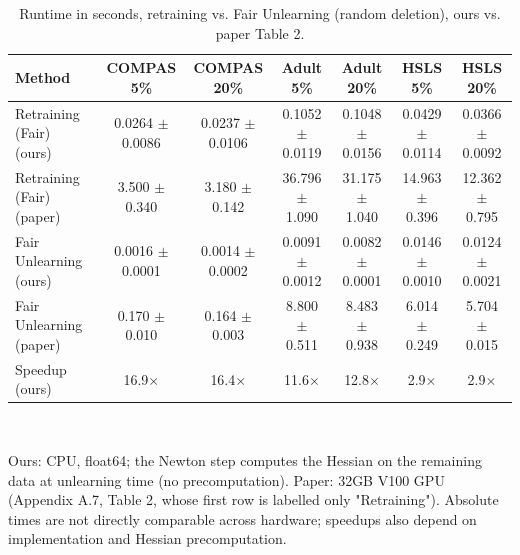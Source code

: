 \begin{table}[t]
\centering
\scriptsize
\caption{Runtime in seconds, retraining vs. Fair Unlearning (random deletion), ours vs. paper Table 2.}
\label{tab:runtime}
\begin{tabular}{lcccccc}
\hline
Method & COMPAS 5\% & COMPAS 20\% & Adult 5\% & Adult 20\% & HSLS 5\% & HSLS 20\% \\
\hline
Retraining (Fair) (ours) & 0.0264 $\pm$ 0.0086 & 0.0237 $\pm$ 0.0106 & 0.1052 $\pm$ 0.0119 & 0.1048 $\pm$ 0.0156 & 0.0429 $\pm$ 0.0114 & 0.0366 $\pm$ 0.0092 \\
Retraining (Fair) (paper) & 3.500 $\pm$ 0.340 & 3.180 $\pm$ 0.142 & 36.796 $\pm$ 1.090 & 31.175 $\pm$ 1.040 & 14.963 $\pm$ 0.396 & 12.362 $\pm$ 0.795 \\
Fair Unlearning (ours) & 0.0016 $\pm$ 0.0001 & 0.0014 $\pm$ 0.0002 & 0.0091 $\pm$ 0.0012 & 0.0082 $\pm$ 0.0001 & 0.0146 $\pm$ 0.0010 & 0.0124 $\pm$ 0.0021 \\
Fair Unlearning (paper) & 0.170 $\pm$ 0.010 & 0.164 $\pm$ 0.003 & 8.800 $\pm$ 0.511 & 8.483 $\pm$ 0.938 & 6.014 $\pm$ 0.249 & 5.704 $\pm$ 0.015 \\
Speedup (ours) & 16.9$\times$ & 16.4$\times$ & 11.6$\times$ & 12.8$\times$ & 2.9$\times$ & 2.9$\times$ \\
\hline
\end{tabular}
\\[2pt]\parbox{\textwidth}{\footnotesize Ours: CPU, float64; the Newton step computes the Hessian on the remaining data at unlearning time (no precomputation). Paper: 32GB V100 GPU (Appendix A.7, Table 2, whose first row is labelled only "Retraining"). Absolute times are not directly comparable across hardware; speedups also depend on implementation and Hessian precomputation.}
\end{table}
